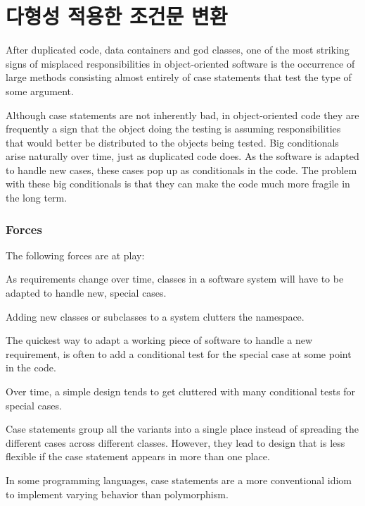 \documentclass[a4paper,10pt,twoside]{book}
\begin{document}
	\renewcommand{\nnbb}[2]{} %
	\sloppy
\fi
\chapter{다형성 적용한 조건문 변환}

After duplicated code, data containers and god classes, one of the most striking signs of misplaced responsibilities in object-oriented software is the occurrence of large methods consisting almost entirely of case statements that test the type of some argument. 

Although case statements are not inherently bad, in object-oriented code they are frequently a sign that the object doing the testing is assuming responsibilities that would better be distributed to the objects being tested. Big conditionals arise naturally over time, just as duplicated code does. As the software is adapted to handle new cases, these cases pop up as conditionals in the code. The problem with these big conditionals is that they can make the code much more fragile in the long term.

\subsection*{Forces}

The following forces are at play:

\begin{bulletlist}
\item As requirements change over time, classes in a software system will have to be adapted to handle new, special cases.

\item Adding new classes or subclasses to a system clutters the namespace.

\item The quickest way to adapt a working piece of software to handle a new requirement, is often to add a conditional test for the special case at some point in the code.

\item Over time, a simple design tends to get cluttered with many conditional tests for special cases.

\item Case statements group all the variants into a single place instead of spreading the different cases across different classes. However, they lead to design that is less flexible if the case statement appears in more than one place. 

\item In some programming languages, case statements are a more conventional idiom to implement varying behavior than polymorphism.
\end{bulletlist}
\end{document}

